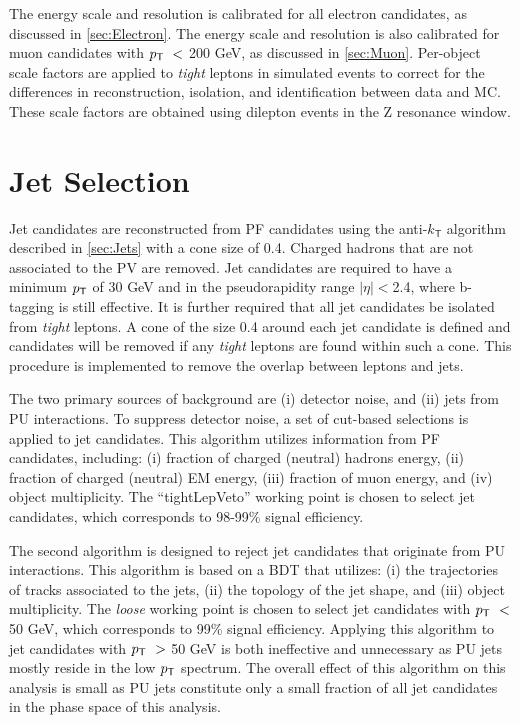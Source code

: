 The energy scale and resolution is calibrated for all electron candidates, as discussed in \autoref{sec:Electron}. The energy scale and resolution is also calibrated for muon candidates with $p_{\textsf{T}}~<$ 200 GeV, as discussed in \autoref{sec:Muon}. Per-object scale factors are applied to \emph{tight} leptons in simulated events to correct for the differences in reconstruction, isolation, and identification between data and \ac{MC}. These scale factors are obtained using dilepton events in the Z resonance window.
\section{Jet Selection}
\label{sec:Jets}

Jet candidates are reconstructed from \ac{PF} candidates using the anti-$k_{\textsf{T}}$ algorithm described in \autoref{sec:Jets} with a cone size of 0.4. Charged hadrons that are not associated to the \ac{PV} are removed. Jet candidates are required to have a minimum $p_{\textsf{T}}$ of 30 GeV and in the pseudorapidity range $|\eta|<$2.4, where b-tagging is still effective. It is further required that all jet candidates be isolated from \emph{tight} leptons. A cone of the size 0.4 around each jet candidate is defined and candidates will be removed if any \emph{tight} leptons are found within such a cone. This procedure is implemented to remove the overlap between leptons and jets. 

The two primary sources of background are (i) detector noise, and (ii) jets from \ac{PU} interactions. To suppress detector noise, a set of cut-based selections is applied to jet candidates. This algorithm utilizes information from \ac{PF} candidates, including: (i) fraction of charged (neutral) hadrons energy, (ii) fraction of charged (neutral) EM energy, (iii) fraction of muon energy, and (iv) object multiplicity. The ``tightLepVeto'' working point is chosen to select jet candidates, which corresponds to 98-99\% signal efficiency.

The second algorithm is designed to reject jet candidates that originate from \ac{PU} interactions. This algorithm is based on a \ac{BDT} that utilizes: (i) the trajectories of tracks associated to the jets, (ii) the topology of the jet shape, and (iii) object multiplicity. The \emph{loose} working point is chosen to select jet candidates with $p_{\textsf{T}}~<$ 50 GeV, which corresponds to 99\% signal efficiency. Applying this algorithm to jet candidates with $p_{\textsf{T}}~>$ 50 GeV is both ineffective and unnecessary as \ac{PU} jets mostly reside in the low $p_{\textsf{T}}$ spectrum. The overall effect of this algorithm on this analysis is small as \ac{PU} jets constitute only a small fraction of all jet candidates in the phase space of this analysis. 

